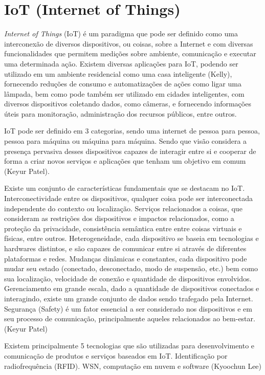 \documentclass[]{politex}
\begin{document}
\section{IoT (Internet of Things)}
\textit{Internet of Things} (IoT) é um paradigma que pode ser definido como uma interconexão de diversos dispositivos, ou coisas, sobre a Internet e com diversas funcionalidades que permitem medições sobre ambiente, comunicação e executar uma determinada ação. Existem diversas aplicações para IoT, podendo ser utilizado em um ambiente residencial como uma casa inteligente (Kelly), fornecendo reduções de consumo e automatizações de ações como ligar uma lâmpada, bem como pode também ser utilizado em cidades inteligentes, com diversos dispositivos coletando dados, como câmeras, e fornecendo informações úteis para monitoração, administração dos recursos públicos, entre outros.

IoT pode ser definido em 3 categorias, sendo uma internet de pessoa para pessoa, pessoa para máquina ou máquina para máquina. Sendo que visão considera a presença pervasiva desses dispositivos capazes de interagir entre si e cooperar de forma a criar novos serviços e aplicações que tenham um objetivo em comum (Keyur Patel).

Existe um conjunto de características fundamentais que se destacam no IoT. Interconectividade entre os dispositivos, qualquer coisa pode ser interconectada independente do contexto ou localização. Serviços relacionados a coisas,  que consideram as restrições dos dispositivos e impactos relacionados, como a proteção da privacidade,  consistência semântica entre entre coisas virtuais e físicas, entre outros. Heterogeneidade, cada dispositivo se baseia em tecnologias e hardwares distintos, e são capazes de comunicar entre si através de diferentes plataformas e redes. Mudanças dinâmicas e constantes, cada dispositivo pode mudar seu estado (conectado, desconectado, modo de suspensão, etc.) bem como sua localização, velocidade de conexão e quantidade de dispositivos envolvidos. Gerenciamento em grande escala, dado a quantidade de dispositivos conectados e interagindo, existe um grande conjunto de dados sendo trafegado pela Internet. Segurança (Safety) é um fator essencial a ser considerado nos dispositivos e em seu processo de comunicação, principalmente aqueles relacionados ao bem-estar.  (Keyur Patel)

Existem principalmente 5 tecnologias que são utilizadas para desenvolvimento e comunicação de produtos e serviços baseados em IoT. Identificação por radiofrequência (RFID). WSN, computação em nuvem e software (Kyoochun Lee)
\end{document}
